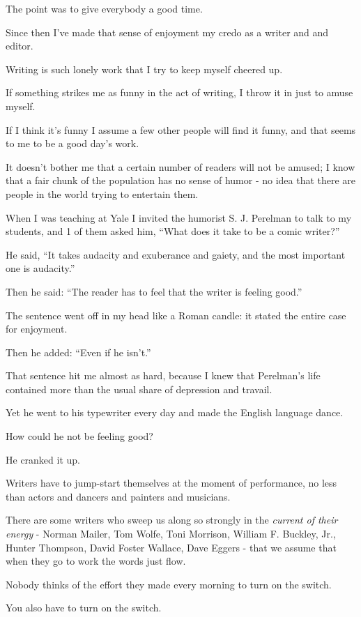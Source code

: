 \documentclass{book}
\numberwithin{equation}{section}
\begin{document}
The point was to give everybody a good time.

%
Since then I've made that sense of enjoyment my credo as a writer and and editor.

Writing is such lonely work that I try to keep myself cheered up.

If something strikes me as funny in the act of writing, I throw it in just to amuse myself.

If I think it's funny I assume a few other people will find it funny, and that seems to me to be a good day's work.

It doesn't bother me that a certain number of readers will not be amused; I know that a fair chunk of the population has no sense of humor - no idea that there are people in the world trying to entertain them.

%
When I was teaching at Yale I invited the humorist S. J. Perelman to talk to my students, and 1 of them asked him, ``What does it take to be a comic writer?''

He said, ``It takes audacity and exuberance and gaiety, and the most important one is audacity.''

Then he said: ``The reader has to feel that the writer is feeling good.''

The sentence went off in my head like a Roman candle: it stated the entire case for enjoyment.

Then he added: ``Even if he isn't.''

That sentence hit me almost as hard, because I knew that Perelman's life contained more than the usual share of depression and travail.

Yet he went to his typewriter every day and made the English language dance.

How could he not be feeling good?

He cranked it up.

%
Writers have to jump-start themselves at the moment of performance, no less than actors and dancers and painters and musicians.

There are some writers who sweep us along so strongly in the \textit{current of their energy} - Norman Mailer, Tom Wolfe, Toni Morrison, William F. Buckley, Jr., Hunter Thompson, David Foster Wallace, Dave Eggers - that we assume that when they go to work the words just flow.

Nobody thinks of the effort they made every morning to turn on the switch.

%
You also have to turn on the switch.
\end{document}

